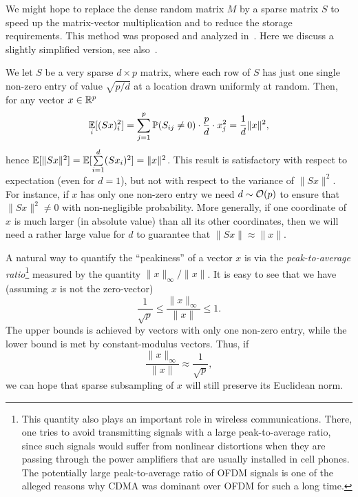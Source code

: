 We might hope to replace the dense random matrix $M$ by a sparse matrix $S$ to speed up the matrix-vector multiplication and to  reduce the storage requirements.  This method was proposed and analyzed in~\cite{Ailon_Chazelle_fast_JL}. Here we discuss a slightly simplified version,  see also~\cite{cohen2015optimal}.

We let $S$ be a very sparse $d \times p$ matrix, where each row of $S$ has just one single non-zero entry of value
$\sqrt{p/d}$ at a location drawn uniformly at random. Then, for any vector $x \in \mathbb{R}^p$ 
\begin{equation*}
  \underset{i}{\mathbb{E}}
   [(Sx)_i^2]=\sum\limits_{j=1}^p \mathbb{P}(S_{ij}\neq 0) \cdot \frac{p}{d} \cdot x^2_j = \frac{1}{d} \|x\|^2,
\end{equation*}
hence $\mathbb{E} [\|Sx\|^2] = \mathbb{E} [\sum\limits^d_{i = 1} (Sx_i)^2]=\|x\|^2$.
This result is satisfactory with respect to expectation (even for $d=1$), but not with respect to the variance of $\|Sx\|^2$. For instance,
if $x$ has only one non-zero entry  we need $d \sim \mathcal{O}(p)$ to ensure that $\|Sx\|^2 \neq 0$ with non-negligible probability. More generally, if one coordinate of $x$ is much larger (in absolute value) than all its other coordinates, then we will need a rather large value for $d$ to guarantee that $\|Sx\| \approx \|x\|$.

A natural way to quantify the ``peakiness'' of a vector $x$ is via the {\em peak-to-average ratio}\footnote{This quantity also plays an important role in wireless communications. There, one tries to avoid transmitting signals with a large peak-to-average ratio, since such signals would suffer from nonlinear distortions when they are passing through  the power amplifiers that are usually installed in cell phones. The potentially large 
peak-to-average ratio of OFDM signals is one of the alleged reasons why CDMA was dominant over OFDM for such a long time.}
measured by the quantity $\|x\|_\infty/\|x\|$.  It is easy to see that we have (assuming $x$ is not the zero-vector)
$$ \frac{1}{\sqrt{p}} \le \frac{\|x\|_\infty}{\|x\|} \le 1.$$
The upper bounds is achieved by vectors with only one non-zero entry, while the lower bound is met by constant-modulus vectors.
Thus, if  
\begin{equation}\label{approxpar}
\frac{\|x\|_\infty}{\|x\|} \approx \frac{1}{\sqrt{p}},
\end{equation}
we can hope that sparse subsampling of $x$ will still preserve its Euclidean norm.

